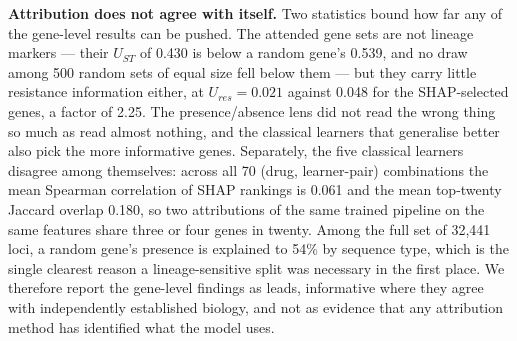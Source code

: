 \textbf{Attribution does not agree with itself.} Two statistics bound how far any of the gene-level
results can be pushed. The attended gene sets are not lineage markers --- their $U_{ST}$ of 0.430
is below a random gene's 0.539, and no draw among 500 random sets of equal size fell below them ---
but they carry little resistance information either, at $U_{res} = 0.021$ against 0.048 for the
SHAP-selected genes, a factor of 2.25. The presence/absence lens did not read the wrong thing so
much as read almost nothing, and the classical learners that generalise better also pick the more
informative genes. Separately, the five classical learners disagree among themselves: across all 70
(drug, learner-pair) combinations the mean Spearman correlation of SHAP rankings is 0.061 and the
mean top-twenty Jaccard overlap 0.180, so two attributions of the same trained pipeline on the same
features share three or four genes in twenty. Among the full set of 32,441 loci, a random gene's
presence is explained to 54\% by sequence type, which is the single clearest reason a
lineage-sensitive split was necessary in the first place. We therefore report the gene-level
findings as leads, informative where they agree with independently established biology, and not as
evidence that any attribution method has identified what the model uses.

